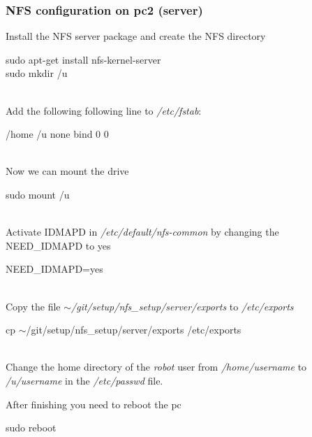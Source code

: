 \subsubsection{NFS configuration on pc2 (server)}
Install the NFS server package and create the NFS directory

\colorbox{light-gray}{
\begin{minipage}{1.0\textwidth} 
	sudo apt-get install nfs-kernel-server \\
	sudo mkdir /u 
\end{minipage} } \\

Add the following following line to \textit{/etc/fstab}:

\colorbox{light-gray}{
\begin{minipage}{1.0\textwidth} 
	/home	/u	none	bind	0	0
\end{minipage} } \\

Now we can mount the drive

\colorbox{light-gray}{
\begin{minipage}{1.0\textwidth} 
	sudo mount /u
\end{minipage} } \\

Activate IDMAPD in \textit{/etc/default/nfs-common} by changing the NEED\_IDMAPD to yes

\colorbox{light-gray}{
\begin{minipage}{1.0\textwidth} 
	NEED\_IDMAPD=yes
\end{minipage} } \\

Copy the file \textit{$\sim$/git/setup/nfs\_setup/server/exports} to \textit{/etc/exports}

\colorbox{light-gray}{
\begin{minipage}{1.0\textwidth} 
	cp $\sim$/git/setup/nfs\_setup/server/exports /etc/exports
\end{minipage} } \\

Change the home directory of the \textit{robot} user from \textit{/home/username} to \textit{/u/username} in the \textit{/etc/passwd} file.

After finishing you need to reboot the pc

\colorbox{light-gray}{
\begin{minipage}{1.0\textwidth} 
	sudo reboot
\end{minipage} } \\

